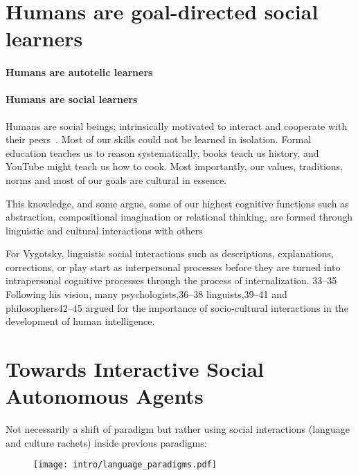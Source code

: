 \section{Humans are goal-directed social learners}

\paragraph{Humans are autotelic learners}

\paragraph{Humans are social learners}

Humans are social beings; intrinsically motivated to interact and cooperate with their peers~\citep{tomasello_cultural_1999,tomasello_understanding_2005, brewer2014addressing}. Most of our skills could not be learned in isolation. Formal education teaches us to reason systematically, books teach us history, and YouTube might teach us how to cook. Most importantly, our values, traditions, norms and most of our goals are cultural in essence.

This knowledge, and some argue, some of our highest cognitive functions such as abstraction, compositional imagination or relational thinking, are formed through linguistic and cultural interactions with others

 For Vygotsky, linguistic social interactions such as descriptions, explanations, corrections, or play start as interpersonal processes before they are turned into intrapersonal cognitive processes through the process of internalization. 33–35 Following his vision, many psychologists,36–38 linguists,39–41 and philosophers42–45 argued for the importance of socio-cultural interactions in the development of human intelligence.


\section{Towards Interactive Social Autonomous Agents}

Not necessarily a shift of paradigm but rather using social interactions (language and culture rachets) inside previous paradigms:

\begin{figure}[!h]
\centering
\texttt{[image: intro/language\_paradigms.pdf]}
\caption{}
\label{fig:intro_language_paradimgs}
\end{figure}

